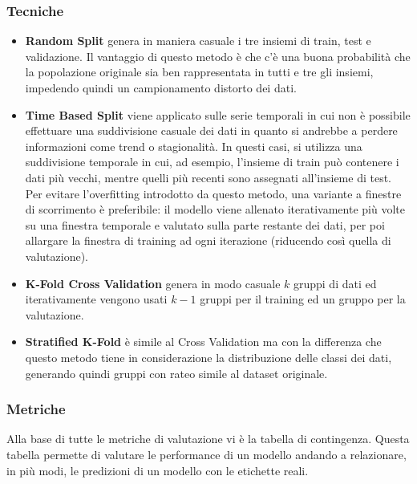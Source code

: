 \subsubsection{Tecniche}
\begin{itemize}
	\item \textbf{Random Split} genera in maniera casuale i tre insiemi di train, test e validazione. Il vantaggio di questo metodo è che c'è una buona probabilità che la popolazione originale sia ben rappresentata in tutti e tre gli insiemi, impedendo quindi un campionamento distorto dei dati.
	\item \textbf{Time Based Split} viene applicato sulle serie temporali in cui non è possibile effettuare una suddivisione casuale dei dati in quanto si andrebbe a perdere informazioni come trend o stagionalità. 
	      In questi casi, si utilizza una suddivisione temporale in cui, ad esempio, l'insieme di train può contenere i dati più vecchi, mentre quelli più recenti sono assegnati all'insieme di test. Per evitare l'overfitting introdotto da questo metodo, una variante a finestre di scorrimento è preferibile: il modello viene allenato iterativamente più volte su una finestra temporale e valutato sulla parte restante dei dati, per poi allargare la finestra di training ad ogni iterazione (riducendo così quella di valutazione).
	\item \textbf{K-Fold Cross Validation} genera in modo casuale $k$ gruppi di dati ed iterativamente vengono usati $k-1$ gruppi per il training ed un gruppo per la valutazione.
	\item \textbf{Stratified K-Fold} è simile al Cross Validation ma con la differenza che questo metodo tiene in considerazione la distribuzione delle classi dei dati, generando quindi gruppi con rateo simile al dataset originale.
\end{itemize}


\subsubsection{Metriche}
Alla base di tutte le metriche di valutazione vi è la tabella di contingenza. Questa tabella permette di valutare le performance di un modello andando a relazionare, in più modi, le predizioni di un modello con le etichette reali.

